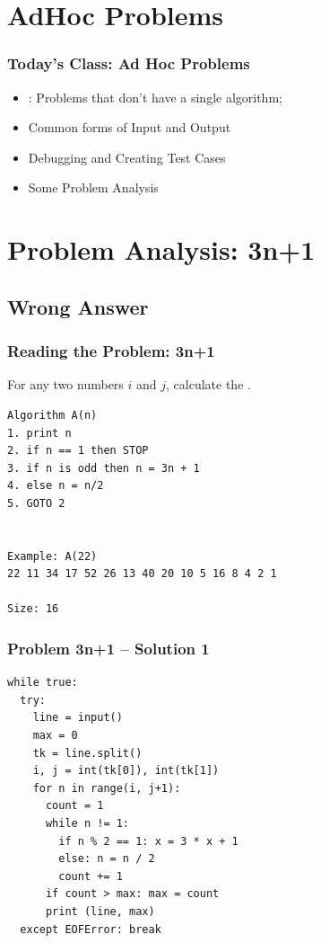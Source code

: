 

\section{AdHoc Problems}
\begin{frame}
  \frametitle{Today's Class: Ad Hoc Problems}

  \begin{itemize}
  \item {}: Problems that don't have a single algorithm;
  \bigskip

  \item Common forms of Input and Output
  \bigskip

  \item Debugging and Creating Test Cases
  \bigskip

  \item Some Problem Analysis
  \end{itemize}

\end{frame}

\section{Problem Analysis: 3n+1}
\subsection{Wrong Answer}
\begin{frame}[fragile]
  \frametitle{Reading the Problem: 3n+1}

  \begin{block}{}
    For any two numbers $i$ and $j$, calculate the .
  \end{block}

  \bigskip

\begin{verbatim}
Algorithm A(n)
1. print n
2. if n == 1 then STOP
3. if n is odd then n = 3n + 1
4. else n = n/2
5. GOTO 2


Example: A(22)
22 11 34 17 52 26 13 40 20 10 5 16 8 4 2 1

Size: 16
\end{verbatim}
\end{frame}

\begin{frame}[fragile]
  \frametitle{Problem 3n+1 -- Solution 1}
\begin{verbatim}
while true:
  try:
    line = input()
    max = 0
    tk = line.split()
    i, j = int(tk[0]), int(tk[1])
    for n in range(i, j+1):
      count = 1
      while n != 1:
        if n % 2 == 1: x = 3 * x + 1
        else: n = n / 2
        count += 1
      if count > max: max = count
      print (line, max)
  except EOFError: break
\end{verbatim}
\end{frame}

